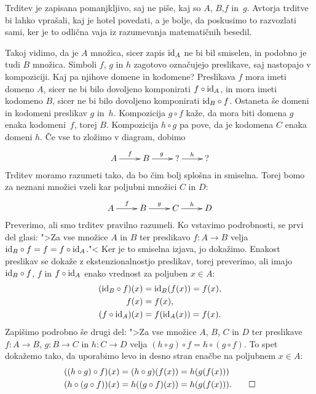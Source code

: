 \begin{dokaz}
  Trditev je zapisana pomanjkljivo, saj ne piše, kaj so $A$, $B$,$ f$ in~$g$. Avtorja
  trditve bi lahko vprašali, kaj je hotel povedati, a je bolje, da poskusimo to razvozlati
  sami, ker je to odlična vaja iz razumevanja matematičnih besedil.

  Takoj vidimo, da je $A$ množica, sicer zapis $\id[A]$ ne bi bil smiselen, in podobno je
  tudi $B$ množica. Simboli $f$, $g$ in $h$ zagotovo označujejo preslikave, saj nastopajo
  v kompoziciji. Kaj pa njihove domene in kodomene? Preslikava $f$ mora imeti domeno $A$,
  sicer ne bi bilo dovoljeno komponirati $f \circ \id[A]$, in mora imeti kodomeno $B$,
  sicer ne bi bilo dovoljeno komponirati $\id[B] \circ f$. Ostaneta še domeni in kodomeni
  preslikav $g$ in~$h$. Kompozicija $g \circ f$ kaže, da mora biti domena $g$ enaka
  kodomeni~$f$, torej $B$. Kompozicija $h \circ g$ pa pove, da je kodomena $C$ enaka
  domeni $h$. Če vse to zložimo v diagram, dobimo
  \begin{equation*}
    \xymatrix{
      {A} \ar[r]^{f}
      &
      {B} \ar[r]^{g}
      &
      {\text{?}} \ar[r]^{h}
      &
      {\text{?}}
    }
  \end{equation*}
  Trditev moramo razumeti tako, da bo čim bolj splošna in smiselna. Torej bomo za neznani
  množici vzeli kar poljubni množici $C$ in $D$:
  \begin{equation*}
    \xymatrix{
      {A} \ar[r]^{f}
      &
      {B} \ar[r]^{g}
      &
      {C} \ar[r]^{h}
      &
      {D}
    }
  \end{equation*}
  Preverimo, ali smo trditev pravilno razumeli. Ko vstavimo podrobnosti, se prvi del
  glasi: ">Za vse množice $A$ in $B$ ter preslikavo $f : A \to B$ velja
  $\id[B] \circ f = f = f \circ \id[A]$."<
  Ker je to smiselna izjava, jo dokažimo. Enakost preslikav se dokaže z ekstenzionalnostjo
  preslikav, torej preverimo, ali imajo $\id[B] \circ f$, $f$ in $f \circ \id[A]$ enako
  vrednost za poljuben $x \in A$:
  \begin{align*}
    (\id[B] \circ f)(x) &= \id[B] (f (x)) = f (x), \\
    f (x) &= f(x), \\
    (f \circ \id[A])(x) &= f (\id[A](x)) = f(x).
  \end{align*}
  Zapišimo podrobno še drugi del: ">Za vse množice $A$, $B$, $C$ in $D$ ter preslikave
  $f : A \to B$, $g : B \to C$ in $h : C \to D$ velja
  $(h \circ g) \circ f = h \circ (g \circ f)$. To spet dokažemo tako, da uporabimo levo in
  desno stran enačbe na poljubnem $x \in A$:
  \begin{align*}
    ((h \circ g) \circ f)(x) &= (h \circ g)(f(x)) = h(g(f(x))) \\
    (h \circ (g \circ f))(x) &= h((g \circ f)(x)) = h(g(f(x))). \qedhere
  \end{align*}
\end{dokaz}


